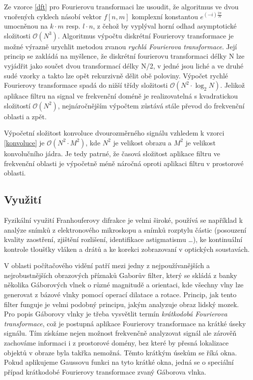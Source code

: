 \documentclass[11pt,a4paper]{article}
\begin{document}
Ze vzorce \ref{dft} pro Fourierovu transformaci lze usoudit, že algoritmus ve dvou vnořených cyklech
násobí vektor $f[n,m]$ komplexní konstantou $e^{(-i)\frac{2\pi}{N}}$ umocněnou na $k\cdot m$ resp.
$l\cdot n$, z čehož by vyplýval horní odhad asymptotické složitosti $\mathcal{O}(N^3)$. 
Algoritmus výpočtu diskrétní Fourierovy transformace je možné výrazně urychlit metodou zvanou 
\textit{rychlá Fourierova transformace}. Její princip se zakládá na myšlence, že diskrétní fourierovu
transformaci délky N lze vyjádřit jako součet dvou transformací délky N/2, v jedné jsou liché a ve
druhé sudé vzorky a takto lze opět rekurzivně dělit obě poloviny. Výpočet rychlé Fourierovy transformace
spadá do nižší třídy složitosti $\mathcal{O}(N^2 \cdot \log_{2}{N})$. Jelikož aplikace filtru na signal ve
frekvenční doméně je realizovatelná s kvadratickou složitostí $\mathcal{O}(N^2)$, nejnáročnějším výpočtem
zůstává stále převod do frekvenční oblasti a zpět.

Výpočetní složitost konvoluce dvourozměrného signálu vzhledem k vzorci \ref{konvoluce} je 
$\mathcal{O}(N^2 \cdot M^2)$, kde $N^2$ je velikost obrazu a $M^2$ je velikost konvolučního jádra. Je 
tedy patrné, že časová složitost aplikace filtru ve frekvenční oblasti je výpočetně méně náročná oproti aplikaci 
filtru v prostorové oblasti. 

\subsection{Využití}
Fyzikální využití Franhouferovy difrakce je velmi široké, používá se například k analýze snímků z elektronového 
mikroskopu a snímků rozptylu částic (posouzení kvality zaostření, zjištění rozlišení, identifikace astigmatismu 
\dots), ke kontinuální kontrole tloušťky vláken a drátů a ke korekci zobrazovaní v optických soustavách. 

V oblasti počítačového vidění patří mezi jedny z nejpoužívanějších a nejrobustnějších obrazových příznaků 
Gaborův filter, který se skládá z banky několika Gáborových vlnek o různé magnitudě a orientaci, kde všechny
vlny lze generovat z bázové vlnky pomocí operací dilatace a rotace. Princip, jak tento filter funguje je velmi 
podobný principu, jakým analyzuje obraz lidský mozek. Pro popis Gáborovy vlnky je třeba vysvětlit termín
\textit{krátkodobá Fourierova transformace}, což je postupná aplikace Fourierovy transformace na krátké
úseky signálu. Tím získáme nejen možnost frekvenčně analyzovat signál ale zárověň zachováme informaci i 
z prostorové domény, bez které by přesná lokalizace objektů v obraze byla takřka nemožná. Těmto krátkým
úsekům se říká okna. Pokud aplikujeme Gaussovu funkci na tyto krátké okna, jedná se o speciální případ
krátkodobé Fourierovy transformace zvaný Gáborova vlnka.
\end{document}
